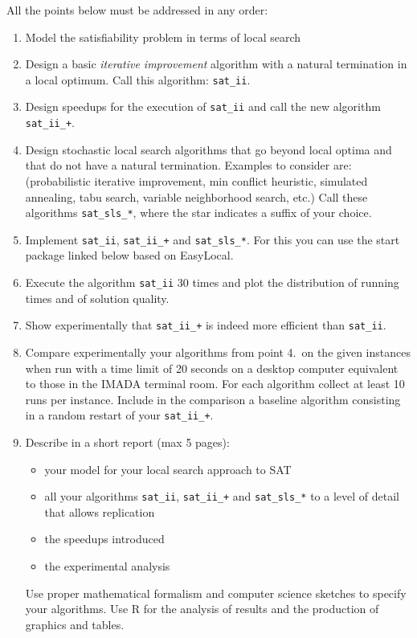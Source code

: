 All the points below must be addressed in any order:

\begin{enumerate}

\item Model the satisfiability problem in terms of local
  search 

\item Design a basic \emph{iterative improvement} algorithm with a
  natural termination in a local optimum. Call this algorithm: \texttt{sat\_ii}.

\item Design speedups for the execution of \texttt{sat\_ii} and call
  the new algorithm \texttt{sat\_ii\_+}.

\item Design stochastic local search algorithms that go beyond local
  optima and that do not have a natural termination. Examples to
  consider are: (probabilistic iterative improvement, min conflict
  heuristic, simulated annealing, tabu search, variable neighborhood
  search, etc.) Call these algorithms \texttt{sat\_sls\_*}, where the
  star indicates a suffix of your choice.


\item Implement \texttt{sat\_ii}, \texttt{sat\_ii\_+} and
  \texttt{sat\_sls\_*}. For this you can use the start package linked below
  based on EasyLocal. 

\item Execute the algorithm \texttt{sat\_ii} 30 times and plot the
  distribution of running times and of solution quality.

\item Show experimentally that \texttt{sat\_ii\_+} is indeed more
  efficient than \texttt{sat\_ii}.

\item Compare experimentally your algorithms from point 4.~on the given
  instances when run with a time limit of 20 seconds on a desktop
  computer equivalent to those in the IMADA terminal room. For each
  algorithm collect at least 10 runs per instance. Include in the
  comparison a baseline algorithm consisting in a random restart of your
  \texttt{sat\_ii\_+}.

\item Describe in a short report (max 5 pages):
  \begin{itemize}
  \item your model for your local search approach to SAT
  \item all your algorithms \texttt{sat\_ii}, \texttt{sat\_ii\_+} and
    \texttt{sat\_sls\_*} to a level of detail that allows replication
  \item the speedups introduced 
  \item the experimental analysis
  \end{itemize}
    Use proper mathematical formalism and computer science sketches to
    specify your algorithms. Use R for the analysis of results and the
    production of graphics and tables.


\end{enumerate}



